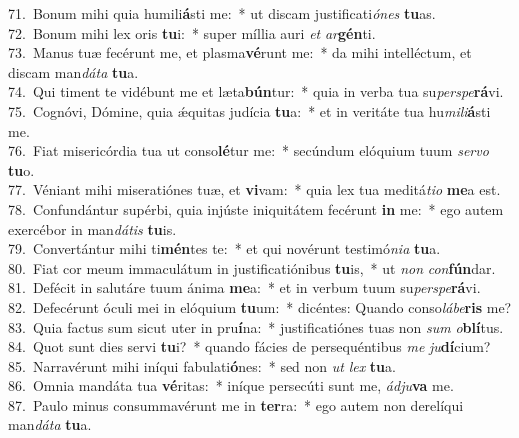 {71.~}Bonum mihi quia humili\textbf{á}sti me:~* ut discam justificati\textit{ó}\textit{nes} \textbf{tu}as.\\
{72.~}Bonum mihi lex oris \textbf{tu}i:~* super míllia auri \textit{et} \textit{ar}\textbf{gén}ti.\\
{73.~}Manus tuæ fecérunt me, et plasma\textbf{vé}runt me:~* da mihi intelléctum, et discam man\textit{dá}\textit{ta} \textbf{tu}a.\\
{74.~}Qui timent te vidébunt me et læta\textbf{bún}tur:~* quia in verba tua su\textit{per}\textit{spe}\textbf{rá}vi.\\
{75.~}Cognóvi, Dómine, quia ǽquitas judícia \textbf{tu}a:~* et in veritáte tua hu\textit{mi}\textit{li}\textbf{á}sti me.\\
{76.~}Fiat misericórdia tua ut conso\textbf{lé}tur me:~* secúndum elóquium tuum \textit{ser}\textit{vo} \textbf{tu}o.\\
{77.~}Véniant mihi miseratiónes tuæ, et \textbf{vi}vam:~* quia lex tua meditá\textit{ti}\textit{o} \textbf{me}a est.\\
{78.~}Confundántur supérbi, quia injúste iniquitátem fecérunt \textbf{in} me:~* ego autem exercébor in man\textit{dá}\textit{tis} \textbf{tu}is.\\
{79.~}Convertántur mihi ti\textbf{mén}tes te:~* et qui novérunt testimó\textit{ni}\textit{a} \textbf{tu}a.\\
{80.~}Fiat cor meum immaculátum in justificatiónibus \textbf{tu}is,~* ut \textit{non} \textit{con}\textbf{fún}dar.\\
{81.~}Defécit in salutáre tuum ánima \textbf{me}a:~* et in verbum tuum su\textit{per}\textit{spe}\textbf{rá}vi.\\
{82.~}Defecérunt óculi mei in elóquium \textbf{tu}um:~* dicéntes: Quando conso\textit{lá}\textit{be}\textbf{ris} me?\\
{83.~}Quia factus sum sicut uter in pru\textbf{í}na:~* justificatiónes tuas non \textit{sum} \textit{o}\textbf{blí}tus.\\
{84.~}Quot sunt dies servi \textbf{tu}i?~* quando fácies de persequéntibus \textit{me} \textit{ju}\textbf{dí}cium?\\
{85.~}Narravérunt mihi iníqui fabulati\textbf{ó}nes:~* sed non \textit{ut} \textit{lex} \textbf{tu}a.\\
{86.~}Omnia mandáta tua \textbf{vé}ritas:~* iníque persecúti sunt me, \textit{ád}\textit{ju}\textbf{va} me.\\
{87.~}Paulo minus consummavérunt me in \textbf{ter}ra:~* ego autem non derelíqui man\textit{dá}\textit{ta} \textbf{tu}a.\\

